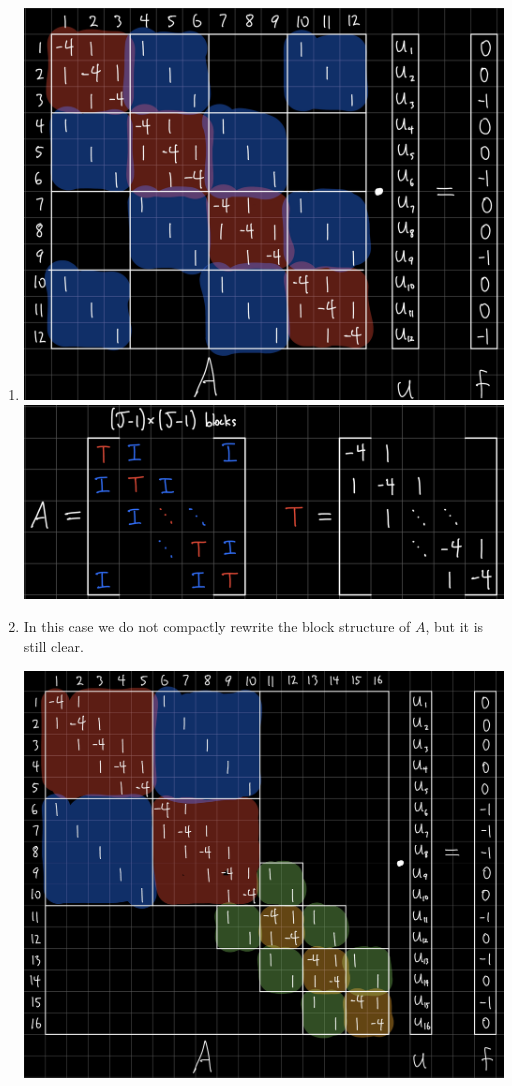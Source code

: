 \documentclass{article}
\begin{document}
\begin{enumerate}
\begin{enumerate}
	
	\item
	\includegraphics[scale=.1]{hw6 d full}
	\includegraphics[scale=.08]{hw6 d block}
	
	
	\item In this case we do not compactly rewrite the block structure of $A$, but it is still clear.
	\begin{center}
		\includegraphics[scale=.1]{hw6 e full}
	\end{center}
	

\end{enumerate}
\end{enumerate}
\end{document}
